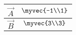 \begin{tabular}{|c|c|}
\hline
$\vec{A}$ & $\myvec{-1\\1}$\\
\hline
$\vec{B}$& $\myvec{3\\3}$\\
\hline
\end{tabular}
